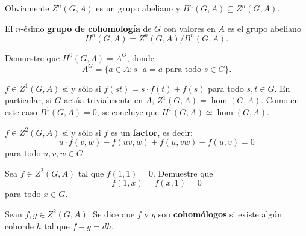 Obviamente $Z^n(G,A)$ es un grupo abeliano y $B^n(G,A)\subseteq Z^n(G,A)$.

\begin{definition}
	El $n$-ésimo \textbf{grupo de cohomología} de $G$ con valores en $A$
	es el grupo abeliano
	\[
	H^n(G,A)=Z^n(G,A)/B^n(G,A).
	\]
\end{definition}

\begin{exercise}
	Demuestre que $H^0(G,A)=A^G$, donde 
	\[
	A^G=\{a\in A:s\cdot a=a\text{ para todo $s\in G$}\}. 
	\]
\end{exercise}


\begin{example}
	$f\in Z^1(G,A)$ si y sólo si $f(st)=s\cdot f(t)+f(s)$ para todo $s,t\in G$.
	En particular, si $G$ actúa trivialmente en $A$, $Z^1(G,A)=\hom(G,A)$. Como
	en este caso $B^1(G,A)=0$, se concluye que $H^1(G,A)\simeq\hom(G,A)$. 
\end{example}

\begin{example}
	$f\in Z^2(G,A)$ si y sólo si $f$ es un \textbf{factor}, es decir:
	\begin{equation}
		\label{eq:2cociclo}
		u\cdot f(v,w)-f(uv,w)+f(u,vw)-f(u,v)=0
	\end{equation}
	para todo $u,v,w\in G$.
\end{example}

\begin{exercise}
	Sea $f\in Z^2(G,A)$ tal que $f(1,1)=0$. Demuestre que 
	\[
	f(1,x)=f(x,1)=0
	\]
	para todo $x\in G$.
\end{exercise}


\begin{definition}
	Sean $f,g\in Z^2(G,A)$. Se dice que $f$ y $g$ son \textbf{cohomólogos} si
	existe algún coborde $h$ tal que $f-g=dh$. 
\end{definition}

